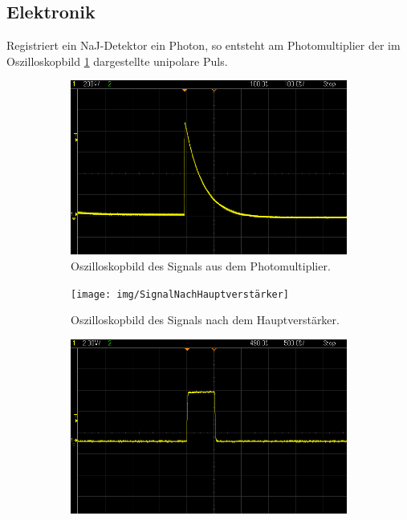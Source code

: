 \subsection{Elektronik}

Registriert ein NaJ-Detektor ein Photon, so entsteht am Photomultiplier der im Oszilloskopbild \ref{SignalNachPhotomultiplier} dargestellte unipolare Puls.
\begin{figure}[H]
	\centering
	\begin{subfigure}[t]{0.495\textwidth}
		\centering
		\includegraphics[width=\textwidth]{img/SignalNachPhotomultiplier}
		\caption{Oszilloskopbild des Signals aus dem Photomultiplier.}
		\label{SignalNachPhotomultiplier}
	\end{subfigure}
	\begin{subfigure}[t]{0.495\textwidth}
		\centering
		\texttt{[image: img/SignalNachHauptverstärker]}
		\caption{Oszilloskopbild des Signals nach dem Hauptverstärker.}
		\label{SignalNachHauptverstärker}
	\end{subfigure}
	\begin{subfigure}[t]{0.495\textwidth}
		\centering
		\includegraphics[width=\textwidth]{img/SignalNachTSCA}

\end{subfigure}
\end{figure}
